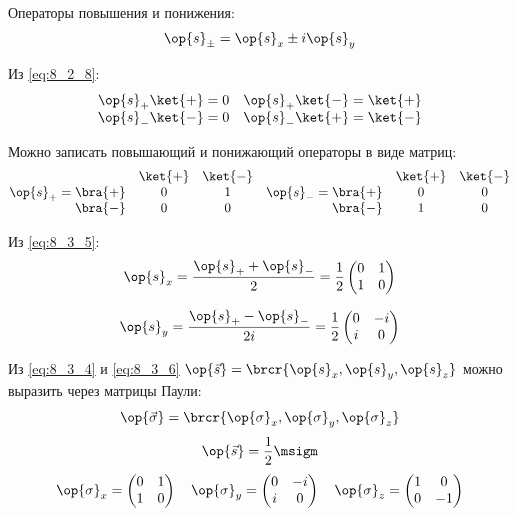 Операторы повышения и понижения:
$$
\op{s}_{\pm} = \op{s}_x \pm i\op{s}_y
$$

Из \eqref{eq:8_2_8}:
$$
\begin{matrix}
\op{s}_{+}\ket{+} = 0 & \op{s}_{+}\ket{-} = \ket{+} \\
\op{s}_{-}\ket{-} = 0 &  \op{s}_{-}\ket{+} = \ket{-}
\end{matrix}
$$

Можно записать повышающий и понижающий операторы в виде матриц:
\begin{equation}
\label{eq:8_3_5}
\op{s}_{+} = 
\begin{matrix}
            & \ket{+} & \ket{-} \\
\bra{+} &  0         & 1         \\
\bra{-}  &  0         & 0         
\end{matrix}
~~~\op{s}_{-} =
\begin{matrix}
            & \ket{+} & \ket{-} \\
\bra{+} &  0         & 0         \\
\bra{-}  &  1         & 0         
\end{matrix}
\end{equation}

Из \eqref{eq:8_3_5}:
\begin{equation}
\label{eq:8_3_6}
\op{s}_x = \frac{\op{s}_{+} + \op{s}_{-}}{2} = \frac{1}{2} \left (
  \begin{matrix}
  0 & 1 \\
  1 & 0 
  \end{matrix}
\right )
\end{equation}

$$
\op{s}_y = \frac{\op{s}_{+} - \op{s}_{-}}{2i} = \frac{1}{2} \left (
  \begin{matrix}
  0 & -i \\
  i & 0 
  \end{matrix}
\right )
$$

Из \eqref{eq:8_3_4} и \eqref{eq:8_3_6} $\op{\vec{s}} = \brcr{\op{s}_x, \op{s}_y, \op{s}_z}$
можно выразить через матрицы Паули:
$$
\op{\vec{\sigma}} = \brcr{\op{\sigma}_x, \op{\sigma}_y, \op{\sigma}_z}
$$
$$
\op{\vec{s}}= \frac{1}{2}\msigm
$$
$$
\op{\sigma}_x = \left (
  \begin{matrix}
  0 & 1 \\
  1 & 0 
  \end{matrix}
\right )
~~~
\op{\sigma}_y = \left (
  \begin{matrix}
  0 & -i \\
  i & 0 
  \end{matrix}
\right )
~~~
\op{\sigma}_z = \left (
  \begin{matrix}
  1 & 0 \\
  0 & -1 
  \end{matrix}
\right )
$$

